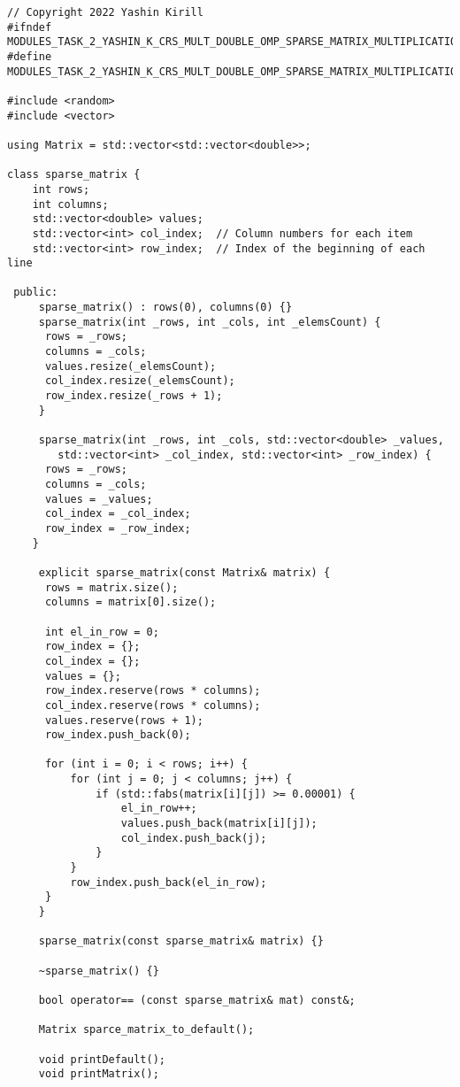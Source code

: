 \documentclass{report}
\begin{document}
\begin{lstlisting}
// Copyright 2022 Yashin Kirill
#ifndef MODULES_TASK_2_YASHIN_K_CRS_MULT_DOUBLE_OMP_SPARSE_MATRIX_MULTIPLICATION_OMP_H_
#define MODULES_TASK_2_YASHIN_K_CRS_MULT_DOUBLE_OMP_SPARSE_MATRIX_MULTIPLICATION_OMP_H_

#include <random>
#include <vector>

using Matrix = std::vector<std::vector<double>>;

class sparse_matrix {
    int rows;
    int columns;
    std::vector<double> values;
    std::vector<int> col_index;  // Column numbers for each item
    std::vector<int> row_index;  // Index of the beginning of each line

 public:
     sparse_matrix() : rows(0), columns(0) {}
     sparse_matrix(int _rows, int _cols, int _elemsCount) {
      rows = _rows;
      columns = _cols;
      values.resize(_elemsCount);
      col_index.resize(_elemsCount);
      row_index.resize(_rows + 1);
     }

     sparse_matrix(int _rows, int _cols, std::vector<double> _values,
        std::vector<int> _col_index, std::vector<int> _row_index) {
      rows = _rows;
      columns = _cols;
      values = _values;
      col_index = _col_index;
      row_index = _row_index;
    }

     explicit sparse_matrix(const Matrix& matrix) {
      rows = matrix.size();
      columns = matrix[0].size();

      int el_in_row = 0;
      row_index = {};
      col_index = {};
      values = {};
      row_index.reserve(rows * columns);
      col_index.reserve(rows * columns);
      values.reserve(rows + 1);
      row_index.push_back(0);

      for (int i = 0; i < rows; i++) {
          for (int j = 0; j < columns; j++) {
              if (std::fabs(matrix[i][j]) >= 0.00001) {
                  el_in_row++;
                  values.push_back(matrix[i][j]);
                  col_index.push_back(j);
              }
          }
          row_index.push_back(el_in_row);
      }
     }

     sparse_matrix(const sparse_matrix& matrix) {}

     ~sparse_matrix() {}

     bool operator== (const sparse_matrix& mat) const&;

     Matrix sparce_matrix_to_default();

     void printDefault();
     void printMatrix();


\end{lstlisting}
\end{document}
